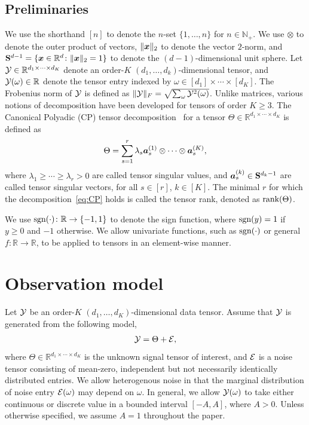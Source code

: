 \documentclass{article}
\theoremstyle{plain}
\theoremstyle{definition}
\def\sign{\textup{sgn}}
\def\rank{\textup{rank}}
\begin{document}
\subsection{Preliminaries}
We use the shorthand $[n]$ to denote the $n$-set $\{1,\ldots,n\}$ for $n\in\mathbb{N}_{+}$. We use $\otimes$ to denote the outer product of vectors, $\lVert\bm x\rVert_2$ to denote the vector $2$-norm, and $\mathbf{S}^{d-1}=\{\bm x\in\mathbb{R}^d\colon \lVert\bm x\rVert_2=1\}$ to denote the $(d-1)$-dimensional unit sphere. Let $\mathcal{Y}\in\mathbb{R}^{d_1\times \cdots \times d_K}$ denote an order-$K$ $(d_1,\ldots,d_k)$-dimensional tensor, and $\mathcal{Y}(\omega)\in\mathbb{R}$ denote the tensor entry indexed by $\omega \in[d_1]\times \cdots \times [d_K]$. The Frobenius norm of $\mathcal{Y}$ is defined as $\lVert\mathcal{Y}\rVert_F=\sqrt{\sum_{\omega}\mathcal{Y}^2(\omega)}$. Unlike matrices, various notions of decomposition have been developed for tensors of order $K\geq 3$. The Canonical Polyadic (CP) tensor decomposition~\cite{hitchcock1927expression} for a tensor $\Theta\in\mathbb{R}^{d_1\times \cdots \times d_K}$ is defined as
\begin{equation}\label{eq:CP}
\Theta=\sum_{s=1}^r\lambda_s \bm{a}^{(1)}_s\otimes\cdots\otimes \bm{a}^{(K)}_s,
\end{equation}
where $\lambda_1\geq \cdots \geq \lambda_r>0$ are called tensor singular values, and $\bm{a}^{(k)}_s \in \mathbf{S}^{d_k-1}$ are called tensor singular vectors, for all $s\in[r]$, $k\in[K]$. The minimal $r$ for which the decomposition~\eqref{eq:CP} holds is called the tensor rank, denoted as $\rank(\Theta)$. 

We use $\sign(\cdot)\colon \mathbb{R}\to\{-1,1\}$ to denote the sign function, where $\sign(y)=1$ if $y\geq 0$ and $-1$ otherwise. We allow univariate functions, such as $\sign(\cdot)$ or general $f\colon \mathbb{R}\to\mathbb{R}$, to be applied to tensors in an element-wise manner. 



\section{Observation model}

Let $\mathcal{Y}$ be an order-$K$ $(d_1,\ldots,d_K)$-dimensional data tensor. Assume that $\mathcal{Y}$ is generated from the following model,
\begin{equation}\label{eq:model}
\mathcal{Y}=\Theta+\mathcal{E},
\end{equation}
where $\Theta\in\mathbb{R}^{d_1\times \cdots \times d_K}$ is the unknown signal tensor of interest, and $\mathcal{E}$ is a noise tensor consisting of mean-zero, independent but not necessarily identically distributed entries. We allow heterogenous noise in that the marginal distribution of noise entry $\mathcal{E}(\omega)$ may depend on $\omega$. In general, we allow $\mathcal{Y}(\omega)$ to take either continuous or discrete value in a bounded interval $[-A, A]$, where $A>0$. Unless otherwise specified, we assume $A=1$ throughout the paper. 
\end{document}
